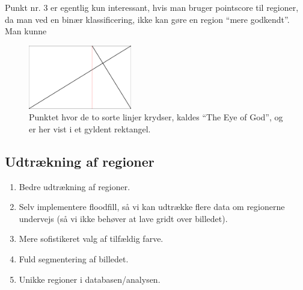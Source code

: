 {Punkt nr. 3 er egentlig kun interessant, hvis man bruger pointscore til
regioner, da man ved en binær klassificering, ikke kan gøre en region
``mere godkendt''. Man kunne

\begin{figure}[!h]
    \centering
    \includegraphics[angle=0,width=0.4\textwidth]{afsnit/fremtidigt_arbejde/billeder/eye_of_god}
    \caption[]{Punktet hvor de to sorte linjer krydser, kaldes ``The Eye
    of God'', og er her vist i et gyldent rektangel.}
    \label{eye_of_god}
\end{figure}

\subsection{Udtrækning af regioner}
\begin{enumerate}
    \item Bedre udtrækning af regioner.
    \item Selv implementere floodfill, så vi kan udtrække flere data om
        regionerne undervejs (så vi ikke behøver at lave gridt over
        billedet).
    \item Mere sofistikeret valg af tilfældig farve.
    \item Fuld segmentering af billedet.
    \item Unikke regioner i databasen/analysen.
\end{enumerate}

}

